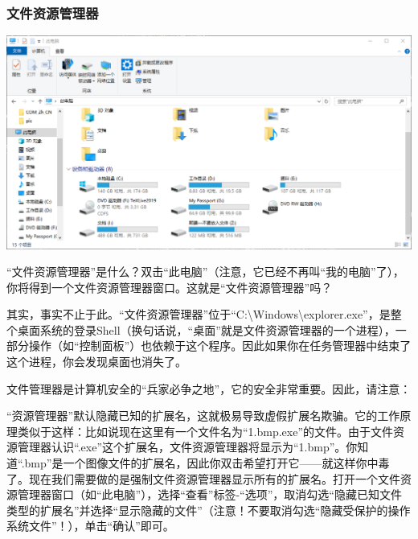 \subsubsection{文件资源管理器}
\begin{center}
	\includegraphics[scale=0.6]{pic/explorer}
\end{center} \par
“文件资源管理器”是什么？双击“此电脑”（注意，它已经不再叫“我的电脑”了），你将得到一个文件资源管理器窗口。这就是“文件资源管理器”吗？\par
其实，事实不止于此。“文件资源管理器”位于“C:\textbackslash Windows\textbackslash explorer.exe”，是整个桌面系统的登录Shell（换句话说，“桌面”就是文件资源管理器的一个进程），一部分操作（如“控制面板”）也依赖于这个程序。因此如果你在任务管理器中结束了这个进程，你会发现桌面也消失了。\par
文件管理器是计算机安全的“兵家必争之地”，它的安全非常重要。因此，请注意：\par
“资源管理器”默认隐藏已知的扩展名，这就极易导致虚假扩展名欺骗。它的工作原理类似于这样：比如说现在这里有一个文件名为“1.bmp.exe”的文件。由于文件资源管理器认识“.exe”这个扩展名，文件资源管理器将显示为“1.bmp”。你知道“.bmp”是一个图像文件的扩展名，因此你双击希望打开它——就这样你中毒了。现在我们需要做的是强制文件资源管理器显示所有的扩展名。打开一个文件资源管理器窗口（如“此电脑”），选择“查看”标签-“选项”，取消勾选“隐藏已知文件类型的扩展名”并选择“显示隐藏的文件”（注意！不要取消勾选“隐藏受保护的操作系统文件”！），单击“确认”即可。
